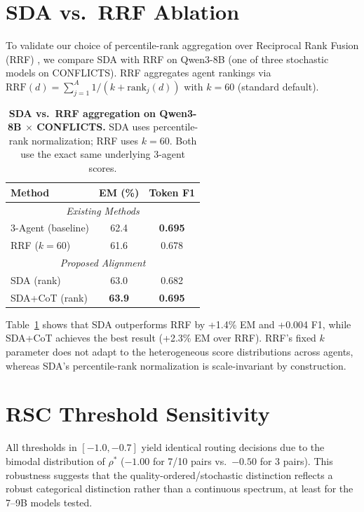 \documentclass[11pt]{article}
\theoremstyle{definition}
\begin{document}
\section{SDA vs.\ RRF Ablation}
\label{sec:appendix-sda-ablation}

To validate our choice of percentile-rank aggregation over Reciprocal
Rank Fusion (RRF) \citep{cormack2009reciprocal}, we compare SDA
with RRF on Qwen3-8B (one of three stochastic models on CONFLICTS).
RRF aggregates agent rankings via
\(\text{RRF}(d) = \sum_{j=1}^{A} 1/(k + \text{rank}_j(d))\)
with \(k = 60\) (standard default).

\begin{table}[ht]
\centering
\footnotesize
\begin{tabular}{@{}l cc@{}}
\toprule
\textbf{Method} & \textbf{EM (\%)} & \textbf{Token F1} \\
\midrule
\multicolumn{3}{c}{\textit{Existing Methods}} \\
3-Agent (baseline) & 62.4 & \textbf{0.695} \\
RRF (\(k=60\))       & 61.6 & 0.678 \\
\midrule
\multicolumn{3}{c}{\textit{Proposed Alignment}} \\
SDA (rank)         & 63.0 & 0.682 \\
SDA+CoT (rank)     & \textbf{63.9} & \textbf{0.695} \\
\bottomrule
\end{tabular}
\caption{\textbf{SDA vs.\ RRF aggregation on Qwen3-8B \(\times\) CONFLICTS.} 
SDA uses percentile-rank normalization; RRF uses \(k=60\). Both use the exact same underlying 3-agent scores.}
\label{tab:sda-vs-rrf}
\end{table}
Table~\ref{tab:sda-vs-rrf} shows that SDA outperforms RRF by +1.4\% EM and +0.004 F1, while SDA+CoT achieves the best result (+2.3\% EM over RRF).
RRF's fixed \(k\) parameter does not adapt to the heterogeneous score distributions across agents, whereas SDA's percentile-rank normalization is scale-invariant by construction.


\section{RSC Threshold Sensitivity}
\label{sec:appendix-threshold}

All thresholds in \([-1.0, -0.7]\) yield identical routing decisions due to the bimodal distribution of \(\rho^*\) (\(-1.00\) for 7/10 pairs vs.\ \(-0.50\) for 3 pairs).
This robustness suggests that the quality-ordered/stochastic distinction reflects a robust categorical distinction rather than a continuous spectrum, at least for the 7--9B models tested.
\end{document}
